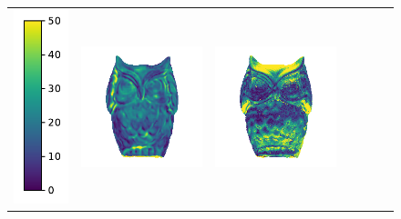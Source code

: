 \begin{figure}
\begin{tabular*}{\linewidth}{@{}c@{}c@{}c@{}c@{}c@{}c@{}c@{}}
\multicolumn{1}{r}{\includegraphics[height=\reswidth\linewidth]{figures/results/examples/colorbar_error_vertical.pdf}} &
\includegraphics[width=\reswidth\linewidth]{figures/results/examples/ours_owlie_errors.png} &
\includegraphics[width=\reswidth\linewidth]{figures/results/examples/jung_owlie_error.png} &

\end{tabular*}
\end{figure}
